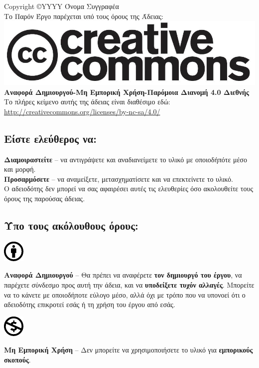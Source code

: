 %
%
\begin{center}
Copyright \copyright YYYY Όνομα Συγγραφέα\\
Το Παρόν Έργο παρέχεται υπό τους όρους της Άδειας:\\
\includegraphics[scale=0.2]{license/images/cc-logo}\\
\textbf{Αναφορά Δημιουργού-Μη Εμπορική Χρήση-Παρόμοια Διανομή 4.0 Διεθνής}\\
Το πλήρες κείμενο αυτής της άδειας είναι διαθέσιμο εδώ:\\
\url{http://creativecommons.org/licenses/by-nc-sa/4.0/}
\end{center}
\subsection*{Είστε ελεύθερος να:}
\noindent
\textbf{Διαμοιραστείτε} -- να αντιγράψετε και αναδιανείμετε το υλικό με οποιοδήπότε μέσο και μορφή.\\
\textbf{Προσαρμόσετε} -- να αναμείξετε, μετασχηματίσετε και να επεκτείνετε το υλικό.\\

Ο αδειοδότης δεν μπορεί να σας αφαιρέσει αυτές τις ελευθερίες όσο ακολουθείτε τους όρους της παρούσας άδειας.
\subsection*{Ύπο τους ακόλουθους όρους:}

\vspace{1em}
\noindent
\parbox{1.5cm}{\includegraphics[scale=1.5]{license/images/cc_by_30}}
\parbox{10.5cm}{\textbf{Αναφορά Δημιουργού} -- Θα πρέπει να αναφέρετε \textbf{τον δημιουργό του έργου}, να παρέχετε σύνδεσμο προς αυτή την άδεια, και να \textbf{υποδείξετε τυχόν αλλαγές}. Μπορείτε να το κάνετε με οποιοδήποτε εύλογο μέσο, αλλά όχι με τρόπο που να υπονοεί ότι ο αδειοδότης επικροτεί εσάς ή τη χρήση του έργου από εσάς.}

\vspace{1em}
\noindent
\parbox{1.5cm}{\includegraphics[scale=1.5]{license/images/cc_nc_30}}
\parbox{10.5cm}{\textbf{Μη Εμπορική Χρήση} --  Δεν μπορείτε να χρησιμοποιήσετε το υλικό για \textbf{εμπορικούς σκοπούς}.}

